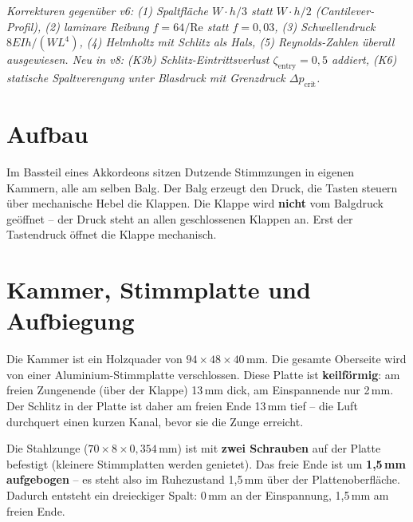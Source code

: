 \documentclass[11pt,a4paper]{article}
\begin{document}
\hbmaketitle

{\small\itshape Korrekturen gegenüber v6: (1) Spaltfläche $W \cdot h/3$ statt $W \cdot h/2$ (Cantilever-Profil), (2) laminare Reibung $f=64/\text{Re}$ statt $f=0{,}03$, (3) Schwellendruck $8EIh/(WL^4)$, (4) Helmholtz mit Schlitz als Hals, (5) Reynolds-Zahlen überall ausgewiesen. Neu in v8: (K3b) Schlitz-Eintrittsverlust $\zeta_\text{entry}=0{,}5$ addiert, (K6) statische Spaltverengung unter Blasdruck mit Grenzdruck $\Delta p_\text{crit}$.}

\vspace{4mm}

\section{Aufbau}

\begin{keybox}
Im Bassteil eines Akkordeons sitzen Dutzende Stimmzungen in eigenen Kammern, alle am selben Balg. Der Balg erzeugt den Druck, die Tasten steuern über mechanische Hebel die Klappen. Die Klappe wird \textbf{nicht} vom Balgdruck geöffnet -- der Druck steht an allen geschlossenen Klappen an. Erst der Tastendruck öffnet die Klappe mechanisch.
\end{keybox}

\section{Kammer, Stimmplatte und Aufbiegung}

Die Kammer ist ein Holzquader von $94 \times 48 \times 40$\,mm. Die gesamte Oberseite wird von einer Aluminium-Stimmplatte verschlossen. Diese Platte ist \textbf{keilförmig}: am freien Zungenende (über der Klappe) 13\,mm dick, am Einspannende nur 2\,mm. Der Schlitz in der Platte ist daher am freien Ende 13\,mm tief -- die Luft durchquert einen kurzen Kanal, bevor sie die Zunge erreicht.

Die Stahlzunge ($70 \times 8 \times 0{,}354$\,mm) ist mit \textbf{zwei Schrauben} auf der Platte befestigt (kleinere Stimmplatten werden genietet). Das freie Ende ist um \textbf{1{,}5\,mm aufgebogen} -- es steht also im Ruhezustand 1{,}5\,mm über der Plattenoberfläche. Dadurch entsteht ein dreieckiger Spalt: 0\,mm an der Einspannung, 1{,}5\,mm am freien Ende.
\end{document}

